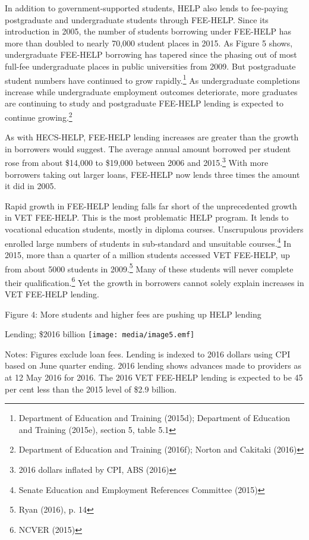 \documentclass[]{book}
\begin{document}
In addition to government-supported students, HELP also lends to fee-paying postgraduate and undergraduate students through FEE-HELP. Since its introduction in 2005, the number of students borrowing under FEE-HELP has more than doubled to nearly 70,000 student places in 2015. As Figure 5 shows, undergraduate FEE-HELP borrowing has tapered since the phasing out of most full-fee undergraduate places in public universities from 2009. But postgraduate student numbers have continued to grow rapidly.\footnote{Department of Education and Training (2015d); Department of Education and Training (2015e), section 5, table 5.1} As undergraduate completions increase while undergraduate employment outcomes deteriorate, more graduates are continuing to study and postgraduate FEE-HELP lending is expected to continue growing.\footnote{Department of Education and Training (2016f); Norton and Cakitaki (2016)}

As with HECS-HELP, FEE-HELP lending increases are greater than the growth in borrowers would suggest. The average annual amount borrowed per student rose from about \$14,000 to \$19,000 between 2006 and 2015.\footnote{2016 dollars inflated by CPI, ABS (2016)} With more borrowers taking out larger loans, FEE-HELP now lends three times the amount it did in 2005.

Rapid growth in FEE-HELP lending falls far short of the unprecedented growth in VET FEE-HELP. This is the most problematic HELP program. It lends to vocational education students, mostly in diploma courses. Unscrupulous providers enrolled large numbers of students in sub-standard and unsuitable courses.\footnote{Senate Education and Employment References Committee (2015)} In 2015, more than a quarter of a million students accessed VET FEE-HELP, up from about 5000 students in 2009.\footnote{Ryan (2016), p. 14} Many of these students will never complete their qualification.\footnote{NCVER (2015)} Yet the growth in borrowers cannot solely explain increases in VET FEE-HELP lending.

\protect\hypertarget{_Ref334870361}{}{}Figure 4: More students and higher fees are pushing up HELP lending

Lending; \$2016 billion \texttt{[image: media/image5.emf]}

Notes: Figures exclude loan fees. Lending is indexed to 2016 dollars using CPI based on June quarter ending. 2016 lending shows advances made to providers as at 12 May 2016 for 2016. The 2016 VET FEE-HELP lending is expected to be 45 per cent less than the 2015 level of \$2.9 billion.
\end{document}
